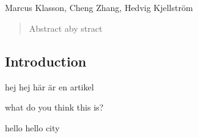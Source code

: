 
\begin{comment}

\begin{flushright}
\textbf{Paper A} \\

\textbf{Hierarchical Grocery Image Dataset} \\

In \textit{Winter Conference on computer vision Applications (WACV), 2019.}

\end{flushright}
\pagecolor{cyan}\afterpage{\nopagecolor}
	
\end{comment}

\renewcommand*{\bibname}{References}
\renewcommand*{\thechapter}{A}  %
\renewcommand{\chaptername}{Paper} %
\renewcommand*{\thepage}{A\arabic{page}}
\setcounter{page}{1}


\chapter{
	}
\begin{center}
	\large{Marcus Klasson, Cheng Zhang, Hedvig Kjellström}
\end{center}
\vspace{5pt}


\begin{abstract}
	Abstract aby stract
	
\end{abstract}

\section{Introduction}\label{sec:paperA_introduction}
hej hej här är en artikel

\newpage

what do you think this is?

\newpage 
hello hello city 